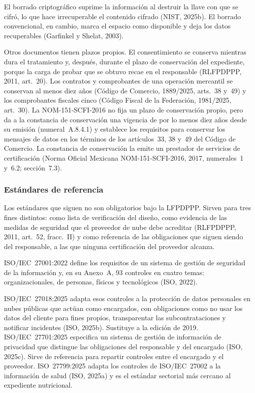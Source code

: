 \documentclass[12pt, a4paper]{article}
\begin{document}
El borrado criptográfico suprime la información al destruir la llave con que se cifró, lo que hace irrecuperable el contenido cifrado
(NIST, 2025b). El borrado
convencional, en cambio, marca el espacio como disponible y deja
los datos recuperables (Garfinkel y Shelat, 2003).

Otros documentos tienen plazos propios. El consentimiento se conserva mientras dura el tratamiento y, después, durante el plazo de conservación del expediente, porque la carga de probar que se obtuvo recae en el responsable (RLFPDPPP, 2011, art.~20). Los contratos y comprobantes de una operación mercantil se conservan al menos diez años (Código de Comercio, 1889/2025, arts.~38 y~49) y los comprobantes fiscales cinco (Código Fiscal de la Federación, 1981/2025, art.~30). La NOM-151-SCFI-2016 no fija un plazo de conservación propio, pero da a la constancia de conservación una vigencia de por lo menos diez años desde su emisión (numeral~A.8.4.1) y establece los requisitos para conservar los mensajes de datos en los términos de los artículos~33, 38 y~49 del Código de Comercio. La constancia de conservación la emite un prestador de servicios de certificación (Norma Oficial Mexicana NOM-151-SCFI-2016, 2017, numerales~1 y~6.2; sección~7.3).
 

 
\subsubsection{Estándares de referencia}
 
Los estándares que siguen no son obligatorios bajo la LFPDPPP.
Sirven para tres fines distintos: como lista de verificación del
diseño, como evidencia de las medidas de seguridad que el
proveedor de nube debe acreditar (RLFPDPPP, 2011, art.~52,
fracc.~II) y como referencia de las obligaciones que siguen siendo
del responsable, a las que ninguna certificación del proveedor
alcanza.
 
ISO/IEC~27001:2022 define los requisitos de un sistema de gestión
de seguridad de la información y, en su Anexo~A, 93 controles en
cuatro temas: organizacionales, de personas, físicos y
tecnológicos (ISO, 2022).
 
ISO/IEC~27018:2025 adapta esos controles a la protección de datos
personales en nubes públicas que actúan como encargados, con
obligaciones como no usar los datos del cliente para fines propios,
transparentar las subcontrataciones y notificar incidentes (ISO,
2025b). Sustituye a la edición de 2019. ISO/IEC~27701:2025
especifica un sistema de gestión de información de privacidad que
distingue las obligaciones del responsable y del encargado (ISO,
2025c). Sirve de referencia para repartir controles entre el encargado
y el proveedor. ISO~27799:2025 adapta los controles
de ISO/IEC~27002 a la información de salud (ISO, 2025a) y es el
estándar sectorial más cercano al expediente nutricional.
 
\end{document}

